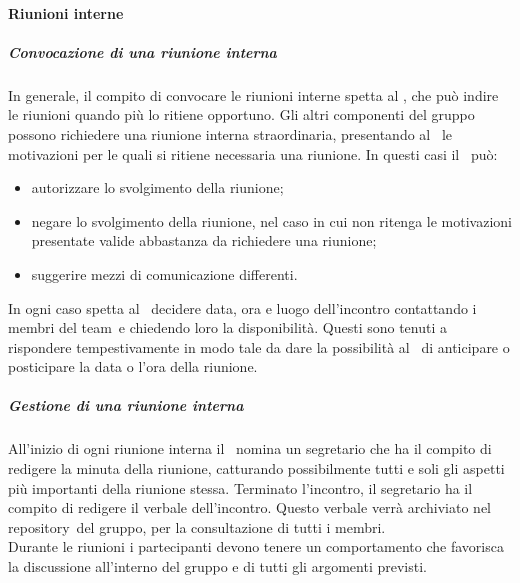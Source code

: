 \documentclass[../NormeProgetto.tex]{subfiles}
\begin{document}
		\paragraph{Riunioni interne}
			\subparagraph{Convocazione di una riunione interna}
				In generale, il compito di convocare le riunioni interne spetta al \responsabilediprogetto, che può indire le riunioni quando più lo ritiene opportuno. Gli altri componenti del gruppo possono richiedere una riunione interna straordinaria, presentando al \responsabilediprogetto\ le motivazioni per le quali si ritiene necessaria una riunione. In questi casi il \responsabilediprogetto\ può:
				\begin{itemize}
					\item autorizzare lo svolgimento della riunione;
					\item negare lo svolgimento della riunione, nel caso in cui non ritenga le motivazioni presentate valide abbastanza da richiedere una riunione;
					\item suggerire mezzi di comunicazione differenti.
				\end{itemize}
				In ogni caso spetta al \responsabilediprogetto\ decidere data, ora e luogo dell'incontro contattando i membri del team\g\ e chiedendo loro la disponibilità. Questi sono tenuti a rispondere tempestivamente in modo tale da dare la possibilità al \responsabilediprogetto\ di anticipare o posticipare la data o l'ora della riunione.
			\subparagraph{Gestione di una riunione interna}
				All'inizio di ogni riunione interna il \responsabilediprogetto\ nomina un segretario che ha il compito di redigere la minuta della riunione, catturando possibilmente tutti e soli gli aspetti più importanti della riunione stessa. Terminato l'incontro, il segretario ha il compito di redigere il verbale dell'incontro. Questo verbale verrà archiviato nel repository\g\ del gruppo, per la consultazione di tutti i membri. \\ Durante le riunioni i partecipanti devono tenere un comportamento che favorisca la discussione all'interno del gruppo e di tutti gli argomenti previsti. 
\end{document}
